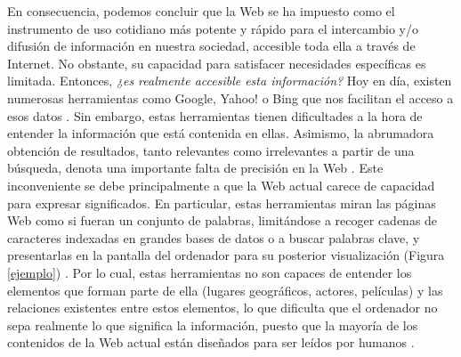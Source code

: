 En consecuencia, podemos concluir que la Web se ha impuesto como el instrumento de uso cotidiano más potente y rápido para el intercambio y/o difusión de información en nuestra sociedad, accesible toda ella a través de Internet. No obstante, su capacidad para satisfacer necesidades específicas es limitada. Entonces, \textit{¿es realmente accesible esta información?} Hoy en día, existen numerosas herramientas como Google, Yahoo! o Bing que nos facilitan el acceso a esos datos \cite{semantica-web}. Sin embargo, estas herramientas tienen dificultades a la hora de entender la información que está contenida en ellas. Asimismo, la abrumadora obtención de resultados, tanto relevantes como irrelevantes a partir de una búsqueda, denota una importante falta de precisión en la Web \cite{coursera}. Este inconveniente se debe principalmente a que la Web actual carece de capacidad para expresar significados. En particular, estas herramientas miran las páginas Web como si fueran un conjunto de palabras, limitándose a recoger cadenas de caracteres indexadas en grandes bases de datos o a buscar palabras clave, y presentarlas en la pantalla del ordenador para su posterior visualización (Figura \ref{ejemplo}) \cite{web-semantica-w3c}. Por lo cual, estas herramientas no son capaces de entender los elementos que forman parte de ella (lugares geográficos, actores, películas) y las relaciones existentes entre estos elementos, lo que dificulta que el ordenador no sepa realmente lo que significa la información, puesto que la mayoría de los contenidos de la Web actual están diseñados para ser leídos por humanos \cite{apuntes-clase-jose}. \\



